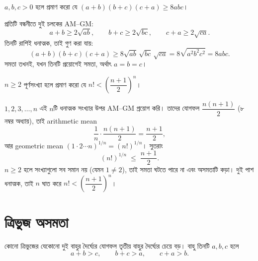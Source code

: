 \documentclass[11pt]{article}
\begin{document}
 $a, b, c > 0$ হলে প্রমাণ করো যে $(a+b)(b+c)(c+a) \geq 8abc$।

\begin{sol}
প্রতিটি বন্ধনীতে দুই চলকের AM--GM:
\[
  a+b \geq 2\sqrt{ab}, \qquad b+c \geq 2\sqrt{bc}, \qquad c+a \geq 2\sqrt{ca} .
\]
তিনটি রাশিই ধনাত্মক, তাই গুণ করা যায়:
\[
  (a+b)(b+c)(c+a) \geq 8 \sqrt{ab}\,\sqrt{bc}\,\sqrt{ca}
  = 8\sqrt{a^2b^2c^2} = 8abc .
\]
সমতা তখনই, যখন তিনটি প্রয়োগেই সমতা, অর্থাৎ $a = b = c$।
\end{sol}

 $n \geq 2$ পূর্ণসংখ্যা হলে প্রমাণ করো যে
$n! < \left( \dfrac{n+1}{2} \right)^{n}$।

\begin{sol}
$1, 2, 3, \dots, n$ এই $n$টি ধনাত্মক সংখ্যার উপর AM--GM প্রয়োগ করি। তাদের যোগফল
$\dfrac{n(n+1)}{2}$ (৮ নম্বর অধ্যায়), তাই arithmetic mean
\[
  \frac{1}{n} \cdot \frac{n(n+1)}{2} = \frac{n+1}{2},
\]
আর geometric mean $(1 \cdot 2 \cdots n)^{1/n} = (n!)^{1/n}$। সুতরাং
\[
  (n!)^{1/n} \;\leq\; \frac{n+1}{2} .
\]
$n \geq 2$ হলে সংখ্যাগুলো সব সমান নয় (যেমন $1 \neq 2$), তাই সমতা ঘটতে পারে না
এবং অসমতাটি কড়া। দুই পাশ ধনাত্মক, তাই $n$ ঘাত করে
$n! < \left( \dfrac{n+1}{2} \right)^{n}$।
\end{sol}

\section{ত্রিভুজ অসমতা}

\begin{idea}[ত্রিভুজ অসমতা, জ্যামিতিক রূপ]
কোনো ত্রিভুজের যেকোনো দুই বাহুর দৈর্ঘ্যের যোগফল তৃতীয় বাহুর দৈর্ঘ্যের চেয়ে বড়।
বাহু তিনটি $a, b, c$ হলে
\[
  a + b > c, \qquad b + c > a, \qquad c + a > b .
\]
\end{idea}

\begin{center}
\end{center}
\end{document}
